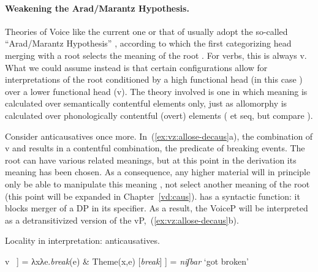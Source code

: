 \begin{exe}
\begin{xlist}
\begin{xlist}
\begin{exe}
\begin{xlist}
\begin{xlist}
\begin{exe}
\begin{xlist}
\begin{xlist}
\begin{exe}
\begin{exe}
\begin{xlist}
\begin{exe}
\begin{exe}
\begin{xlist}
\begin{exe}
\begin{exe}
\begin{exe}
\begin{exe}
\begin{exe}
\begin{xlist}
\begin{exe}
\begin{xlist}
\begin{exe}
\begin{exe}
\begin{xlist}
\begin{exe}
\begin{xlist}
\begin{exe}
\begin{exe}
\begin{exe}
\begin{xlist}
\begin{exe}
\begin{exe}
\paragraph{Weakening the Arad/Marantz Hypothesis.} Theories of Voice like the current one or that of \cite{layering15} usually adopt the so-called ``Arad/Marantz Hypothesis'' \citep{elenasamioti14}, according to which the first categorizing head merging with a root selects the meaning of the root \citep{arad03,marantz13}. For verbs, this is always v. What we could assume instead is that certain configurations allow for interpretations of the root conditioned by a high functional head (in this case {\vz}) over a lower functional head (v). The theory involved is one in which meaning is calculated over semantically contentful elements only, just as allomorphy is calculated over phonologically contentful (overt) elements (\citealt{embick10} et seq, but compare \citealt{kastnermoskal18}).

Consider anticausatives once more. In~(\ref{ex:vz:allose-decaus}a), the combination of v and  results in a contentful combination, the predicate of breaking events. The root can have various related meanings, but at this point in the derivation its meaning has been chosen. As a consequence, any higher material will in principle only be able to manipulate this meaning \citep{arad03}, not select another meaning of the root (this point will be expanded in Chapter~\ref{vd:caus}). {\vz} has a syntactic function: it blocks merger of a DP in its specifier. As a result, the VoiceP will be interpreted as a detransitivized version of the vP,~(\ref{ex:vz:allose-decaus}b).
 \begin{exe}
 \ex  Locality in interpretation: anticausatives.\label{ex:vz:allose-decaus} 
 \begin{xlist} 
     \ex  {[}v ~\!] = λxλe.\emph{break}(e) \& Theme(x,e) 
     \ex  {[}\textbf{\vz} [\emph{break}] ] = \emph{niʃbar} `got broken' 
 \z
\z 


\end{xlist}
\end{exe}
\end{exe}
\end{exe}
\end{xlist}
\end{exe}
\end{exe}
\end{exe}
\end{xlist}
\end{exe}
\end{xlist}
\end{exe}
\end{exe}
\end{xlist}
\end{exe}
\end{xlist}
\end{exe}
\end{exe}
\end{exe}
\end{exe}
\end{exe}
\end{xlist}
\end{exe}
\end{exe}
\end{xlist}
\end{exe}
\end{exe}
\end{xlist}
\end{xlist}
\end{exe}
\end{xlist}
\end{xlist}
\end{exe}
\end{xlist}
\end{xlist}
\end{exe}

